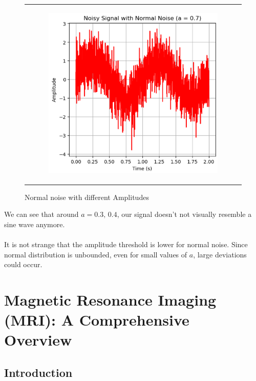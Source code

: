 \documentclass[hidelinks,12pt]{article}
\begin{document}
\begin{figure}[!h]
\begin{tabular}{c}
\begin{subfigure}[h]{0.3\textwidth}
			\end{subfigure}
			\hfill
			\begin{subfigure}[h]{0.3\textwidth}
				\centering
				\includegraphics[width=\textwidth]{figures/normal_noise/0.7.png}
			\end{subfigure} \\
			
		\end{tabular}
		\caption{Normal noise with different Amplitudes}
	\end{figure}
	
	
	 We can see that around $a=0.3,\,0.4$, our signal doesn't not visually resemble a sine wave anymore.
	\\ \\
	 It is not strange that the amplitude threshold is lower for normal noise. Since normal distribution is unbounded, even for small values of $a$, large deviations could occur.
	
	\pagebreak
	
	
	\section{Magnetic Resonance Imaging (MRI): A Comprehensive Overview}
	\subsection{Introduction}
	
\end{document}
